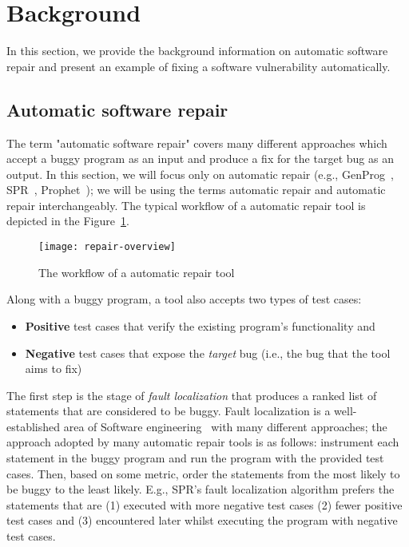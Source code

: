 \section{Background}
\label{section:background}

In this section, we provide the background information on automatic software repair and present an example of fixing a software vulnerability automatically.

\subsection{Automatic software repair}

The term "automatic software repair" covers many different approaches which accept a buggy program as an input and produce a fix for the target bug as an output.
In this section, we will focus only on \GV automatic repair (e.g., GenProg~\cite{le2012systematic}, SPR~\cite{long2015staged}, Prophet~\cite{long2015prophet}); we will be using the terms \GV automatic repair and automatic repair interchangeably.
The typical workflow of a \GV automatic repair tool is depicted in the Figure~\ref{figure:repair-overview}.

\begin{figure}
    \texttt{[image: repair-overview]}
    \caption{The workflow of a \GV automatic repair tool}
    \label{figure:repair-overview}
\end{figure}

Along with a buggy program, a \GV tool also accepts two types of test cases:
\begin{itemize}
    \item \textbf{Positive} test cases that verify the existing program's functionality and
    \item \textbf{Negative} test cases that expose the \emph{target} bug (i.e., the bug that the tool aims to fix)
\end{itemize}

The first step is the stage of \emph{fault localization} that produces a ranked list of statements that are considered to be buggy. Fault localization is a well-established area of Software engineering~\cite{wong2009survey} with many different approaches; the approach adopted by many automatic repair tools is as follows: instrument each statement in the buggy program and run the program with the provided test cases. Then, based on some metric, order the statements from the most likely to be buggy to the least likely. E.g., SPR's fault localization algorithm prefers the statements that are (1) executed with more negative test cases (2) fewer positive test cases and (3) encountered later whilst executing the program with negative test cases.

